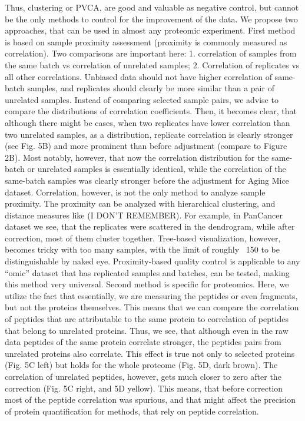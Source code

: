 \documentclass[num-refs]{wiley-article}
\begin{document}
Thus, clustering or PVCA, are good and valuable as negative control, but cannot be the only methods to control for the improvement of the data. We propose two approaches, that can be used in almost any proteomic experiment.
First method is based on sample proximity assessment (proximity is commonly measured as correlation). Two comparisons are important here: 1. correlation of samples from the same batch vs correlation of unrelated samples; 2. Correlation of replicates vs all other correlations. Unbiased data should not have higher correlation of same-batch samples, and replicates should clearly be more similar than a pair of unrelated samples. Instead of comparing selected sample pairs, we advise to compare the distributions of correlation coefficients. Then, it becomes clear, that although there might be cases, when two replicates have lower correlation than two unrelated samples, as a distribution, replicate correlation is clearly stronger (see Fig. 5B) and more prominent than before adjustment (compare to Figure 2B). Most notably, however, that now the correlation distribution for the same-batch or unrelated samples is essentially identical, while the correlation of the same-batch samples was clearly stronger before the adjustment for Aging Mice dataset. Correlation, however, is not the only method to analyze sample proximity. The proximity can be analyzed with hierarchical clustering, and distance measures like (I DON’T REMEMBER). For example, in PanCancer dataset we see, that the replicates were scattered in the dendrogram, while after correction, most of them cluster together. Tree-based visualization, however, becomes tricky with too many samples, with the limit of roughly ~150 to be distinguishable by naked eye. Proximity-based quality control is applicable to any “omic” dataset that has replicated samples and batches, can be tested, making this method very universal. 
Second method is specific for proteomics. Here, we utilize the fact that essentially, we are measuring the peptides or even fragments, but not the proteins themselves. This means that we can compare the correlation of peptides that are attributable to the same protein to correlation of peptides that belong to unrelated proteins. Thus, we see, that although even in the raw data peptides of the same protein correlate stronger, the peptides pairs from unrelated proteins also correlate. This effect is true not only to selected proteins (Fig. 5C left) but holds for the whole proteome (Fig. 5D, dark brown). The correlation of unrelated peptides, however, gets much closer to zero after the correction (Fig. 5C right, and 5D yellow). This means, that before correction most of the peptide correlation was spurious, and that might affect the precision of protein quantification for methods, that rely on peptide correlation.
\end{document}

